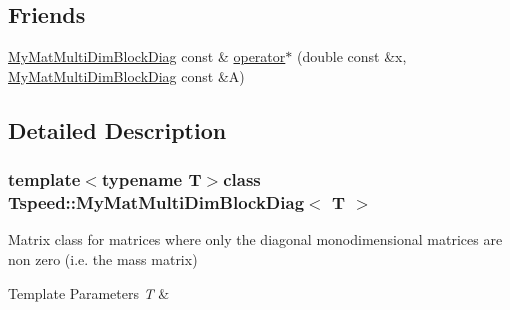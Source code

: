 \subsection*{Friends}
\begin{DoxyCompactItemize}
\item 
\hyperlink{classTspeed_1_1MyMatMultiDimBlockDiag}{My\-Mat\-Multi\-Dim\-Block\-Diag} const \& \hyperlink{classTspeed_1_1MyMatMultiDimBlockDiag_a2be04a4f228649a2efc0af5ac011852e}{operator$\ast$} (double const \&x, \hyperlink{classTspeed_1_1MyMatMultiDimBlockDiag}{My\-Mat\-Multi\-Dim\-Block\-Diag} const \&A)
\end{DoxyCompactItemize}


\subsection{Detailed Description}
\subsubsection*{template$<$typename T$>$class Tspeed\-::\-My\-Mat\-Multi\-Dim\-Block\-Diag$<$ T $>$}

Matrix class for matrices where only the diagonal monodimensional matrices are non zero (i.\-e. the mass matrix) 


\begin{DoxyTemplParams}{Template Parameters}
{\em T} & \\
\hline
\end{DoxyTemplParams}


